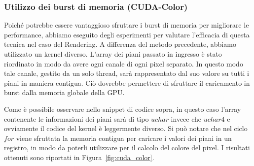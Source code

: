 \subsubsection{Utilizzo dei burst di memoria (CUDA-Color)}
Poiché potrebbe essere vantaggioso sfruttare i burst di memoria per migliorare le performance, abbiamo eseguito degli
esperimenti per valutare l'efficacia di questa tecnica nel caso del Rendering.
A differenza del metodo precedente, abbiamo utilizzato un kernel diverso.
L'array dei piani passato in ingresso è stato riordinato in modo da avere ogni canale di ogni pixel separato.
In questo modo tale canale, gestito da un solo thread, sarà rappresentato dal suo valore su tutti i piani in maniera contigua.
Ciò dovrebbe permettere di sfruttare il caricamento in burst dalla memoria globale della GPU.

Come è possibile osservare nello snippet di codice sopra, in questo caso l'array contenente le informazioni dei piani
sarà di tipo $uchar$ invece che $uchar4$ e ovviamente il codice del kernel è leggermente diverso.
Si può notare che nel ciclo $for$ viene sfruttata la memoria contigua per caricare i valori dei piani in un registro,
in modo da poterli utilizzare per il calcolo del colore del pixel.
I risultati ottenuti sono riportati in Figura~\ref{fig:cuda_color}.
